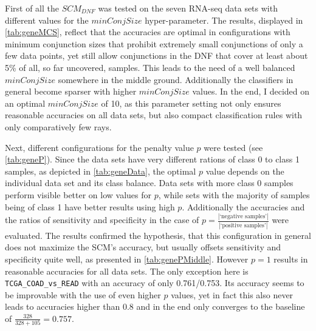 First of all the \(SCM_{DNF}\) was tested on the seven RNA-seq data sets with different values for
the \(minConjSize\) hyper-parameter.
The results, displayed in \autoref{tab:geneMCS}, reflect that the accuracies are optimal in
configurations with minimum conjunction sizes that prohibit extremely small conjunctions of only
a few data points, yet still allow conjunctions in the DNF that cover at least about 5\% of all, so far uncovered, samples.
This leads to the need of a well balanced \(minConjSize\) somewhere in the middle ground.
Additionally the classifiers in general become sparser with higher \(minConjSize\) values.
In the end, I decided on an optimal \(minConjSize\) of 10, as this parameter setting not only
ensures reasonable accuracies on all data sets, but also compact classification rules with only
comparatively few rays.

Next, different configurations for the penalty value \(p\) were tested (see \autoref{tab:geneP}).
Since the data sets have very different rations of class 0 to class 1 samples, as depicted in \autoref{tab:geneData},
the optimal \(p\) value depends on the individual data set and its class balance.
Data sets with more class 0 samples perform visible better on low values for \(p\), while
sets with the majority of samples being of class 1 have better results using high \(p\).
Additionally the accuracies and the ratios of sensitivity and specificity
in the case of \(p=\frac{|\text{`negative samples'}|}{|\text{`positive samples'}|}\) were evaluated.
The results confirmed the hypothesis, that this configuration in general does not maximize
the SCM's accuracy, but usually offsets sensitivity and specificity quite well, as presented in \autoref{tab:genePMiddle}.
However \(p=1\) results in reasonable accuracies for all data sets.
The only exception here is \texttt{TCGA\_COAD\_vs\_READ} with an accuracy of only 0.761/0.753.
Its accuracy seems to be improvable with the use of even higher \(p\) values,
yet in fact this also never leads to accuracies higher than 0.8 and in the end only
converges to the baseline of \(\frac{328}{328+105} = 0.757\).

